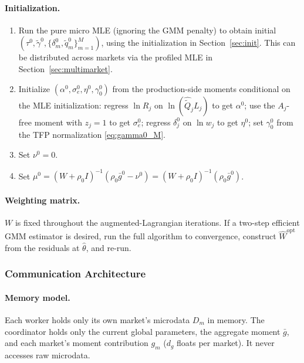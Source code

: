 \documentclass[11pt]{article}
\begin{document}
\paragraph{Initialization.}
\begin{enumerate}[label=(\roman*)]
\item Run the pure micro MLE (ignoring the GMM penalty) to obtain initial $(\tau^0,\tilde\gamma^0,\{\delta_m^0,\tilde q_m^0\}_{m=1}^M)$, using the initialization in Section~\ref{sec:init}. This can be distributed across markets via the profiled MLE in Section~\ref{sec:multimarket}.
\item Initialize $(\alpha^0,\sigma_e^0,\eta^0,\gamma_0^0)$ from the production-side moments conditional on the MLE initialization: regress $\ln R_j$ on $\ln(\hat{\tilde Q}_j L_j)$ to get $\alpha^0$; use the $A_j$-free moment with $z_j=1$ to get $\sigma_e^0$; regress $\delta_j^0$ on $\ln w_j$ to get $\eta^0$; set $\gamma_0^0$ from the TFP normalization \eqref{eq:gamma0_M}.
\item Set $\nu^0 = 0$.
\item Set $\mu^0 = (W+\rho_0 I)^{-1}(\rho_0\bar g^0 - \nu^0) = (W+\rho_0 I)^{-1}(\rho_0\bar g^0)$.
\end{enumerate}

\paragraph{Weighting matrix.} $W$ is fixed throughout the augmented-Lagrangian iterations. If a two-step efficient GMM estimator is desired, run the full algorithm to convergence, construct $\hat W^{\text{opt}}$ from the residuals at $\hat\theta$, and re-run.

\subsubsection{Communication Architecture}\label{sec:communication}

\paragraph{Memory model.} Each worker holds only its own market's microdata $D_m$ in memory. The coordinator holds only the current global parameters, the aggregate moment $\bar g$, and each market's moment contribution $g_m$ ($d_g$ floats per market). It never accesses raw microdata.
\end{document}
